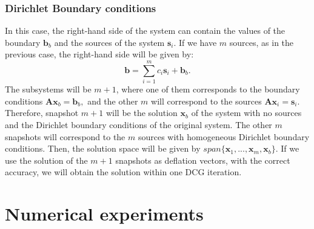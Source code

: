 \documentclass[review]{elsarticle}
\begin{document}
\subsubsection*{{Dirichlet Boundary conditions}}
In this case, the right-hand side of the system can contain the values of the boundary $\mathbf{b}_b$ and the sources of the system $\mathbf{s}_i$. 
If we have $m$ sources, as in the previous case, the right-hand side will be given by:
$$\mathbf{b}=\sum_{i=1}^{m} {c}_i\mathbf{s}_i+\mathbf{b}_b.$$
The subsystems will be $m+1$, where one of them corresponds to the boundary conditions
 $\mathbf{A}\mathbf{x}_b=\mathbf{b}_b,$
 and the other $m$ will correspond to the sources
$\mathbf{A}\mathbf{x}_i=\mathbf{s}_i.$
Therefore, snapshot $m+1$ will be the solution $\mathbf{x}_b$ of the system with no sources and the Dirichlet boundary conditions of the original system. The other $m$ snapshots will correspond to the $m$ sources with homogeneous Dirichlet boundary conditions. Then, the solution space will be given by $ span\{\mathbf{x}_1,...,\mathbf{x}_{m},\mathbf{x}_b\}$.
If we use the solution of the $m+1$ snapshots as deflation vectors, with the correct accuracy, we will obtain the solution within one DCG iteration.

\section{Numerical experiments}\label{numexp}
\end{document}
